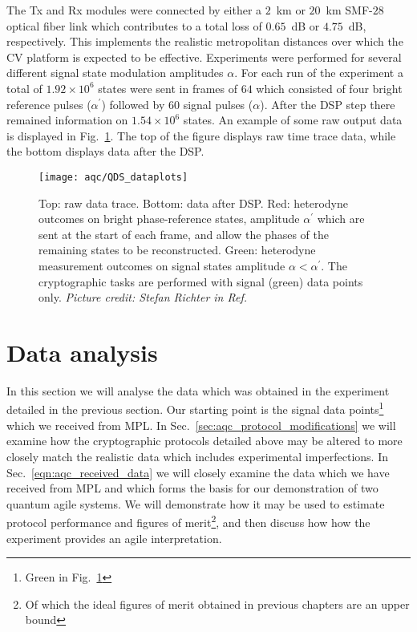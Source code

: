 The Tx and Rx modules were connected by either a $2$~km or $20$~km SMF-$28$ optical fiber link which contributes to a total loss of $0.65$~dB or $4.75$~dB, respectively. This implements the realistic metropolitan distances over which the CV platform is expected to be effective. Experiments were performed for several different signal state modulation amplitudes $\alpha$. For each run of the experiment a total of $1.92\times 10^6$ states were sent in frames of $64$ which consisted of four bright reference pulses ($\alpha^\prime$) followed by $60$ signal pulses ($\alpha$). After the DSP step there remained information on $1.54 \times 10^6$ states. An example of some raw output data is displayed in Fig.~\ref{fig:aqc_experimental_trace}. The top of the figure displays raw time trace data, while the bottom displays data after the DSP.


\begin{figure}[htp]
\captionsetup{width=0.8\linewidth}
\centering
\texttt{[image: aqc/QDS\_dataplots]}
\caption{\label{fig:aqc_experimental_trace} Top: raw data trace. Bottom: data after DSP. Red: heterodyne outcomes on bright phase-reference states, amplitude $\alpha^\prime$ which are sent at the start of each frame, and allow the phases of the remaining states to be reconstructed. Green: heterodyne measurement outcomes on signal states amplitude $\alpha < \alpha^\prime$. The cryptographic tasks are performed with signal (green) data points only. \emph{Picture credit: Stefan Richter in Ref.~\cite{Richter2020}}
}
\end{figure}

\clearpage
\section{Data analysis}
In this section we will analyse the data which was obtained in the experiment detailed in the previous section. Our starting point is the signal data points\footnote{Green in Fig.~\ref{fig:aqc_experimental_trace}} which we received from MPL. In Sec.~\ref{sec:aqc_protocol_modifications} we will examine how the cryptographic protocols detailed above may be altered to more closely match the realistic data which includes experimental imperfections. %
In Sec.~\ref{eqn:aqc_received_data} we will closely examine the data which we have received from MPL and which forms the basis for our demonstration of two quantum agile systems. We will demonstrate how it may be used to estimate protocol performance and figures of merit\footnote{Of which the ideal figures of merit obtained in previous chapters are an upper bound}, and then discuss how how the experiment provides an agile interpretation.

